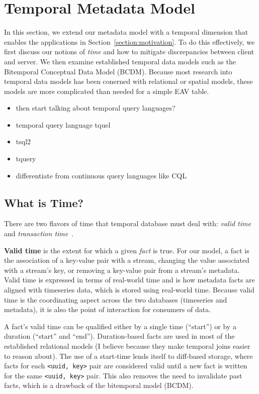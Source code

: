 \section{Temporal Metadata Model} \label{section:temporal}

In this section, we extend our metadata model with a temporal dimension that
enables the applications in Section~\ref{section:motivation}. To do this effectively, we first
discuss our notions of \emph{time} and how to mitigate discrepancies between client and server.
We then examine established temporal data models such as the Bitemporal Conceptual Data Model (BCDM).
Because most research into temporal data models has been conerned with relational or spatial models,
these models are more complicated than needed for a simple EAV table.

\begin{itemize}
\item then start talking about temporal query languages?
\item temporal query language tquel~\cite{snodgrass1987temporal}
\item tsql2~\cite{snodgrass2012tsql2}
\item tquery~\cite{kahn1991tquery}
\item differentiate from continuous query languages like CQL~\cite{arasu2006cql}
\end{itemize}

\subsection{What is Time?}

There are two flavors of time that temporal database must deal with:
\emph{valid time} and \emph{transaction time}~\cite{jensen1999temporal}\cite{jensen1996semantics}. 

\textbf{Valid time} is the extent for which a given \emph{fact} is true. For
our model, a fact is the association of a key-value pair with a stream,
changing the value associated with a stream's key, or removing a key-value pair
from a stream's metadata. Valid time is expressed in terms of real-world time
and is how metadata facts are aligned with timeseries data, which is stored
using real-world time. Because valid time is the coordinating aspect across the
two databases (timeseries and metadata), it is also the point of interaction
for consumers of data.

A fact's valid time can be qualified either by a single time (``start'') or by
a duration (``start'' and ``end''). Duration-based facts are used in most of
the established relational models (I believe because they make temporal joins
easier to reason about).  The use of a start-time lends itself to diff-based
storage, where facts for each \texttt{<uuid, key>} pair are considered valid
until a new fact is written for the same \texttt{<uuid, key>} pair. This also
removes the need to invalidate past facts, which is a drawback of the
bitemporal model (BCDM).

